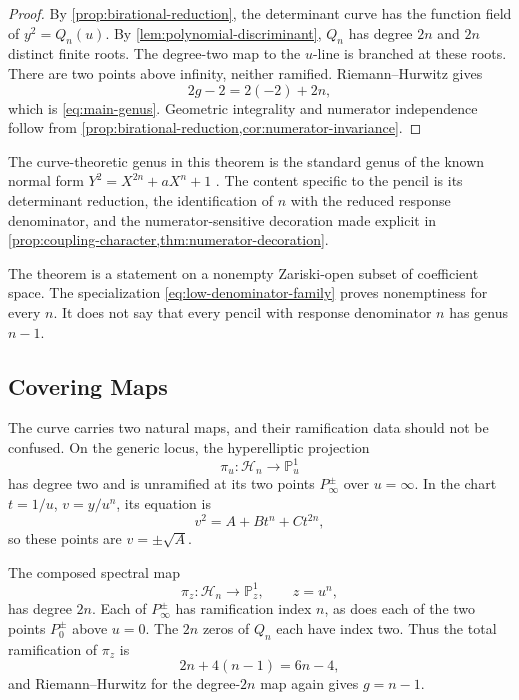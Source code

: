 \documentclass[11pt,reqno]{amsart}
\theoremstyle{remark}
\newcommand{\PP}{\mathbb P}
\newcommand{\cH}{\mathcal H}
\begin{document}
\begin{proof}
By \cref{prop:birational-reduction}, the determinant curve has the function
field of $y^2=Q_n(u)$.  By \cref{lem:polynomial-discriminant}, $Q_n$ has
degree $2n$ and $2n$ distinct finite roots.  The degree-two map to the
$u$-line is branched at these roots.  There are two points above infinity,
neither ramified.  Riemann--Hurwitz gives
\[
 2g-2=2(-2)+2n,
\]
which is \eqref{eq:main-genus}.  Geometric integrality and numerator
independence follow from \cref{prop:birational-reduction,cor:numerator-invariance}.
\end{proof}

The curve-theoretic genus in this theorem is the standard genus of the known
normal form $Y^2=X^{2n}+aX^n+1$ \cite{Shaska2003}.  The content specific to the
pencil is its determinant reduction, the identification of $n$ with the
reduced response denominator, and the numerator-sensitive decoration made
explicit in \cref{prop:coupling-character,thm:numerator-decoration}.

The theorem is a statement on a nonempty Zariski-open subset of coefficient
space.  The specialization \eqref{eq:low-denominator-family} proves
nonemptiness for every $n$.  It does not say that every pencil with response
denominator $n$ has genus $n-1$.

\subsection{Covering Maps}

The curve carries two natural maps, and their ramification data should not be
confused.  On the generic locus, the hyperelliptic projection
\begin{equation}\label{eq:pi-u}
 \pi_u:\cH_n\longrightarrow\PP^1_u
\end{equation}
has degree two and is unramified at its two points $P_\infty^\pm$ over
$u=\infty$.  In the chart $t=1/u$, $v=y/u^n$, its equation is
\begin{equation}\label{eq:infinity-chart}
 v^2=A+Bt^n+Ct^{2n},
\end{equation}
so these points are $v=\pm\sqrt A$.

The composed spectral map
\begin{equation}\label{eq:pi-z}
 \pi_z:\cH_n\longrightarrow\PP^1_z,
 \qquad z=u^n,
\end{equation}
has degree $2n$.  Each of $P_\infty^\pm$ has ramification index $n$, as does
each of the two points $P_0^\pm$ above $u=0$.  The $2n$ zeros of $Q_n$ each
have index two.  Thus the total ramification of $\pi_z$ is
\begin{equation}\label{eq:pi-z-total-ramification}
 2n+4(n-1)=6n-4,
\end{equation}
and Riemann--Hurwitz for the degree-$2n$ map again gives $g=n-1$.
\end{document}
